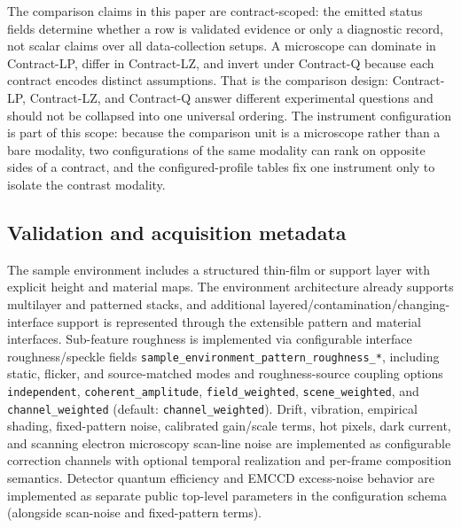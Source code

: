 The comparison claims in this paper are contract-scoped: the emitted status fields determine whether a row is validated evidence or only a diagnostic record, not scalar claims over all data-collection setups. A microscope can dominate in Contract-LP, differ in Contract-LZ, and invert under Contract-Q because each contract encodes distinct assumptions. That is the comparison design: Contract-LP, Contract-LZ, and Contract-Q answer different experimental questions and should not be collapsed into one universal ordering. The instrument configuration is part of this scope: because the comparison unit is a microscope rather than a bare modality, two configurations of the same modality can rank on opposite sides of a contract, and the configured-profile tables fix one instrument only to isolate the contrast modality.

\subsection{Validation and acquisition metadata}

The sample environment includes a structured thin-film or support layer with explicit height and material maps. The environment architecture already supports multilayer and patterned stacks, and additional layered/contamination/changing-interface support is represented through the extensible pattern and material interfaces. Sub-feature roughness is implemented via configurable interface roughness/speckle fields \texttt{sample\_environment\_pattern\_roughness\_*}, including static, flicker, and source-matched modes and roughness-source coupling options \texttt{independent}, \texttt{coherent\_amplitude}, \texttt{field\_weighted}, \texttt{scene\_weighted}, and \texttt{channel\_weighted} (default: \texttt{channel\_weighted}). Drift, vibration, empirical shading, fixed-pattern noise, calibrated gain/scale terms, hot pixels, dark current, and scanning electron microscopy scan-line noise are implemented as configurable correction channels with optional temporal realization and per-frame composition semantics. Detector quantum efficiency and EMCCD excess-noise behavior are implemented as separate public top-level parameters in the configuration schema (alongside scan-noise and fixed-pattern terms).

